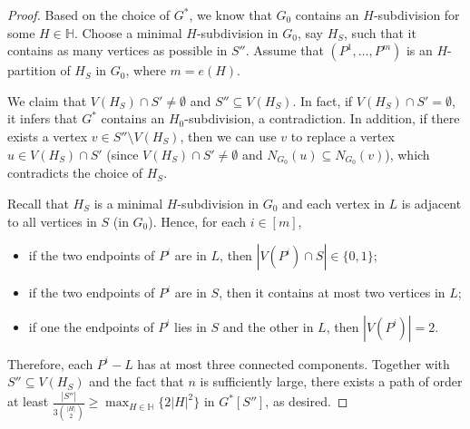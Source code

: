 \documentclass[11pt, a4paper]{article}
\theoremstyle{definition}
\newcommand{\<}{\subseteq}
\newcommand{\red}[1]{\textcolor[rgb]{1.00,0.00,0.00}{#1}}
\begin{document}
\begin{proof}
    Based on the choice of $G^*$, we know that $G_0$ contains an $H$-subdivision for some $H\in\mathbb{H}$. Choose a minimal $H$-subdivision in $G_0$, say $H_S$, such that it contains as many vertices as possible in $S''$. Assume that $(P^1,\ldots,P^{m})$ is an $H$-partition of $H_S$ in $G_0$, where $m=e(H)$. 
    
    We claim that $V(H_S)\cap S'\neq\emptyset$ and $S''\subseteq V(H_S)$.
    In fact, if $V(H_S)\cap S'=\emptyset$, it infers that $G^*$ contains an $H_0$-subdivision, a contradiction. 
    In addition, if there exists a vertex $v\in S''\setminus V(H_S)$, then we can use $v$ to replace a vertex $u\in V(H_S)\cap S'$ (since $V(H_S)\cap S'\neq\emptyset$ and $N_{G_0}(u)\subseteq N_{G_0}(v)$), which contradicts the choice of $H_S$. 

    Recall that %
    $H_S$ is a minimal $H$-subdivision in 
$G_0$ and each vertex in $L$ is adjacent to all vertices in $S$ (in $G_0$). Hence, for each $i\in [m]$, %
    \begin{itemize}
        \item if the two endpoints of $P^i$ are in $L$, then  $|V(P^i)\cap S|\in \{0,1\}$;
        \item if the two endpoints  of $P^i$ are in $S$, then it contains at most two vertices in $L$;
        \item if one the endpoints  of $P^i$ lies  in $S$ and the other in $L$, then $|V(P^i)|=2$. 
    \end{itemize}
Therefore, each $P^i-L$ has at most three connected components.  
    Together with $S''\subseteq V(H_S)$ and the fact that $n$ is sufficiently large, there exists a path of order at least $\frac{|S''|}{3\binom{|H|}{2}}\geq \max_{H\in \mathbb{H}}\{2|H|^2\}$ in $G^*[S'']$, as desired.
  \end{proof}
\end{document}
